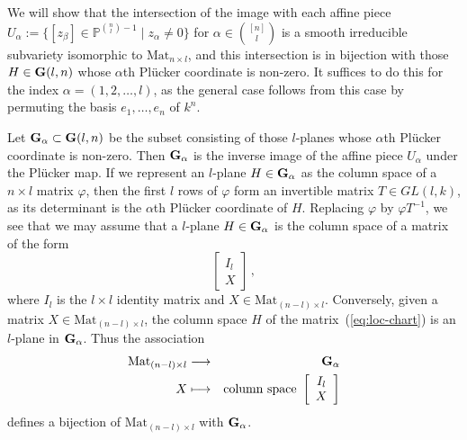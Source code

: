 \documentclass[12pt]{amsart}
\newcommand{\G}{{\bf G}}
\begin{document}
We will show that the intersection of the image with each affine piece
$U_\alpha:=
\{[z_\beta]\in{\mathbb P}^{\binom{n}{l}-1}\mid z_\alpha\neq 0\}$ for 
$\alpha\in\binom{[n]}{l}$ is a smooth
irreducible subvariety isomorphic to $\mbox{Mat}_{n\times l}$, 
and this intersection is in bijection with
those $H\in \G(l,n)$ whose $\alpha$th 
Pl\"ucker coordinate is non-zero.
It suffices to do this for the index $\alpha=(1,2,\ldots,l)$, as the general
case follows from this case by permuting the basis $e_1,\ldots,e_n$ of 
$k^n$.

Let $\G_\alpha\subset \G(l,n)$ be the subset consisting of those $l$-planes
whose $\alpha$th Pl\"ucker coordinate is non-zero.
Then $\G_\alpha$ is the inverse image of the affine piece $U_\alpha$ under
the Pl\"ucker map.
If we represent an $l$-plane $H\in\G_\alpha$ as the 
column space of a $n\times l$ matrix $\varphi$, then the first $l$ rows of
$\varphi$ form an invertible matrix $T\in GL(l,k)$, as its
determinant is the $\alpha$th Pl\"ucker coordinate of $H$. 
Replacing $\varphi$ by $\varphi T^{-1}$, we see that we may assume that a
$l$-plane  $H\in \G_\alpha$ is the column space of a matrix of the form
%
\begin{equation}\label{eq:loc-chart}
  \left[\begin{array}{c}I_l\\ X\end{array}\right]\,,
\end{equation}
%
where $I_l$ is the $l\times l$ identity matrix
and $X\in\mbox{Mat}_{(n-l)\times l}$.
Conversely, given a matrix $X\in\mbox{Mat}_{(n-l)\times l}$, 
the column space $H$ of the matrix~(\ref{eq:loc-chart}) is an 
$l$-plane in $\G_\alpha$.
Thus the association
%
\begin{eqnarray*}
  \mbox{Mat}_{(n-l)\times l}&\longrightarrow&\G_\alpha\\
          X       &  \longmapsto & \mbox{column space }
     \left[\begin{array}{c}I_l\\ X\end{array}\right]
\end{eqnarray*}
%
defines a bijection of $\mbox{Mat}_{(n-l)\times l}$ with $\G_\alpha$.
\end{document}

